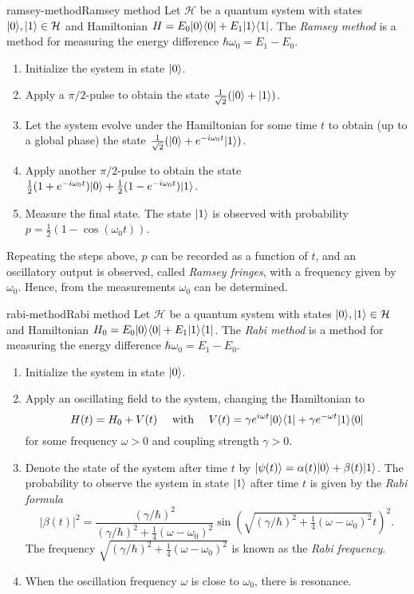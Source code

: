 \begin{topic}{ramsey-method}{Ramsey method}
    Let $\mathcal{H}$ be a quantum system with states $|0\rangle, |1\rangle \in \mathcal{H}$ and Hamiltonian $H = E_0 |0\rangle \langle0| + E_1 |1\rangle \langle1|$. The \emph{Ramsey method} is a method for measuring the energy difference $\hbar \omega_0 = E_1 - E_0$.
    \begin{enumerate}[label=(\arabic*)]
        \item Initialize the system in state $|0\rangle$.
        \item Apply a $\pi/2$-pulse to obtain the state $\frac{1}{\sqrt{2}} (|0\rangle + |1\rangle)$.
        \item Let the system evolve under the Hamiltonian for some time $t$ to obtain (up to a global phase) the state $\frac{1}{\sqrt{2}}(|0\rangle + e^{-i \omega_0 t} |1\rangle)$.
        \item Apply another $\pi/2$-pulse to obtain the state $\frac{1}{2} (1 + e^{-i \omega_0 t}) |0\rangle + \frac{1}{2} (1 - e^{-i \omega_0 t}) |1\rangle$.
        \item Measure the final state. The state $|1\rangle$ is observed with probability $p = \frac{1}{2}(1 - \cos(\omega_0 t))$.
    \end{enumerate}
    Repeating the steps above, $p$ can be recorded as a function of $t$, and an oscillatory output is observed, called \textit{Ramsey fringes}, with a frequency given by $\omega_0$. Hence, from the measurements $\omega_0$ can be determined.
\end{topic}

\begin{topic}{rabi-method}{Rabi method}
    Let $\mathcal{H}$ be a quantum system with states $|0\rangle, |1\rangle \in \mathcal{H}$ and Hamiltonian $H_0 = E_0 |0\rangle \langle0| + E_1 |1\rangle \langle1|$. The \emph{Rabi method} is a method for measuring the energy difference $\hbar \omega_0 = E_1 - E_0$.
    \begin{enumerate}[label=(\arabic*)]
        \item Initialize the system in state $|0\rangle$.
        \item Apply an oscillating field to the system, changing the Hamiltonian to
        \[ H(t) = H_0 + V(t) \quad \textup{ with } \quad V(t) = \gamma e^{i \omega t} |0\rangle \langle1| + \gamma e^{-\omega t} |1\rangle \langle0| \]
        for some frequency $\omega > 0$ and coupling strength $\gamma > 0$.
        \item Denote the state of the system after time $t$ by $|\psi(t)\rangle = \alpha(t) |0\rangle + \beta(t) |1\rangle$. The probability to observe the system in state $|1\rangle$ after time $t$ is given by the \textit{Rabi formula}
        \[ |\beta(t)|^2 = \frac{(\gamma / \hbar)^2}{(\gamma / \hbar)^2 + \tfrac{1}{4} (\omega - \omega_0)^2} \sin \left( \sqrt{(\gamma / \hbar)^2 + \tfrac{1}{4} (\omega - \omega_0)^2} t \right)^2 . \]
        The frequency $\sqrt{(\gamma / \hbar)^2 + \tfrac{1}{4} (\omega - \omega_0)^2}$ is known as the \textit{Rabi frequency}.
        \item When the oscillation frequency $\omega$ is close to $\omega_0$, there is resonance.
    \end{enumerate}
\end{topic}

